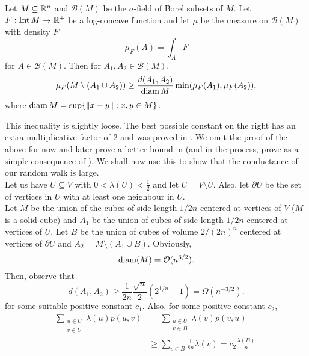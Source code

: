 \begin{ftheo}
\label{conductance isoperimetric inequality}
	Let $M\subseteq\mathbb{R}^n$ and $\mathcal{B}(M)$ be the $\sigma$-field of Borel subsets of $M$. Let $F:\operatorname{Int} M\to\mathbb{R}^+$ be a log-concave function and let $\mu$ be the measure on $\mathcal{B}(M)$ with density $F$
	\[ \mu_F(A) = \int_A F \]
	for $A\in\mathcal{B}(M)$. Then for $A_1,A_2\in\mathcal{B}(M)$,
	\[ \mu_F(M \setminus (A_1\cup A_2)) \geq \frac{d(A_1,A_2)}{\operatorname{diam} M} \min(\mu_F(A_1),\mu_F(A_2)), \]
	where $\operatorname{diam} M = \sup\{\left\lVert x-y\right\rVert:x,y\in M\}$.
\end{ftheo}

This inequality is slightly loose. The best possible constant on the right has an extra multiplicative factor of $2$ and was proved in \cite{dyer-frieze-sample-outside}. We omit the proof of the above for now and later prove a better bound in  (and in the process, prove  as a simple consequence of ). We shall now use this to show that the conductance of our random walk is large.\\
Let us have $U\subseteq V$ with $0<\lambda(U)<\frac{1}{2}$ and let $\overline{U}=V\setminus U$. Also, let $\partial{U}$ be the set of vertices in $\overline{U}$ with at least one neighbour in $U$.\\
Let $M$ be the union of the cubes of side length $1/2n$ centered at vertices of $V$ ($M$ is a solid cube) and $A_1$ be the union of cubes of side length $1/2n$ centered at vertices of $U$. Let $B$ be the union of cubes of volume $2/(2n)^n$ centered at vertices of $\partial U$ and $A_2 = M \setminus (A_1 \cup B)$. Obviously,
\begin{equation}
	\operatorname{diam}(M) = \mathcal{O}(n^{3/2}).
\end{equation}
Then, observe that
\begin{equation}
	d(A_1,A_2) \geq \frac{1}{2n}\frac{\sqrt{n}}{2} (2^{1/n} - 1) = \Omega(n^{-3/2}).
\end{equation}
for some suitable positive constant $c_1$. Also, for some positive constant $c_2$,
\begin{align*}
	\sum_{\substack{u\in U \\ v \in \overline{U}}}\lambda(u)p(u,v) &= \sum_{\substack{u\in U \\ v \in B}}\lambda(v)p(v,u)\\
	&\geq \sum_{v\in B} \frac{1}{8n} \lambda(v) = c_2\frac{\lambda(B)}{n}.
\end{align*}

